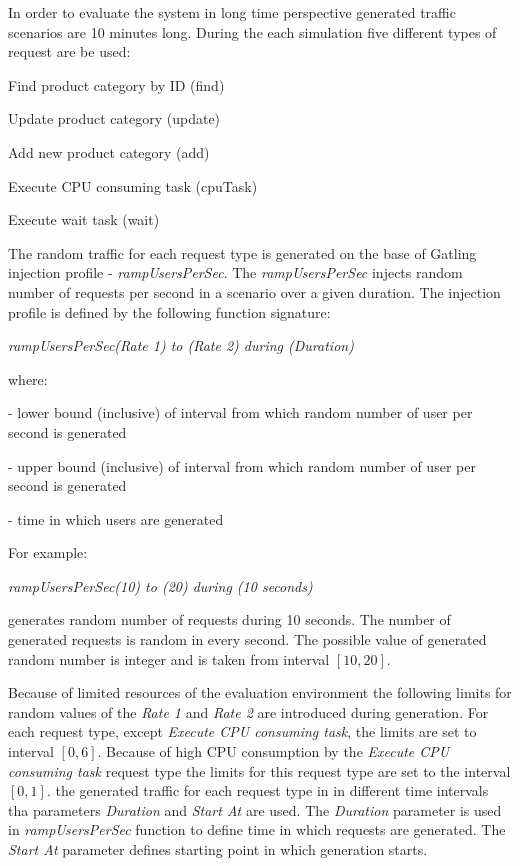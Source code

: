 \documentclass[12pt,a4paper]{article}
\let\tempone\itemize
\let\temptwo\enditemize
\renewenvironment{itemize}{\tempone\addtolength{\itemsep}{-0.4\baselineskip}}{\temptwo}
\begin{document}
In order to evaluate the system in long time perspective generated traffic scenarios are 10 minutes long. 
During the each simulation five different types of request are be used:
\begin{itemize}
\item Find product category by ID (find)
\item Update product	category (update)
\item Add new product category (add)
\item Execute CPU consuming task (cpuTask)
\item Execute wait task (wait)
\end{itemize}

The random traffic for each request type is generated on the base of Gatling injection profile - \textit{rampUsersPerSec}. The \textit{rampUsersPerSec} injects random number of requests per second in a scenario over a given duration. The injection profile is defined by the following function signature:  
\begin{center}
\textit{rampUsersPerSec(Rate 1) to (Rate 2) during (Duration)}
\end{center}
where:
\begin{itemize}
\item[\textit{Rate 1}] - lower bound (inclusive) of interval from which random number of user per second is generated
\item[\textit{Rate 2}] - upper bound (inclusive) of interval from which random number of user per second is generated
\item[\textit{Duration}] - time in which users are generated
\end{itemize}

For example:

\begin{center}
\textit{rampUsersPerSec(10) to (20) during (10 seconds)}
\end{center}

generates random number of requests during 10 seconds. The number of generated requests is random in every second. The possible value of generated random number is integer and is taken from interval $[10,20]$. 

Because of limited resources of the evaluation environment the following limits for random values of the \textit{Rate 1} and \textit{Rate 2} are introduced during generation.  For each request type, except \textit{Execute CPU consuming task}, the limits are set to interval $[0,6]$. Because of high CPU consumption by the \textit{Execute CPU consuming task} request type the limits for this request type are set to the interval $[0,1]$. 
the generated traffic for each request type in in different time intervals tha parameters \textit{Duration} and \textit{Start At} are used. The \textit{Duration} parameter is used in \textit{rampUsersPerSec} function to define time in which requests are generated. The \textit{Start At} parameter defines starting point in which generation starts. 
\end{document}
